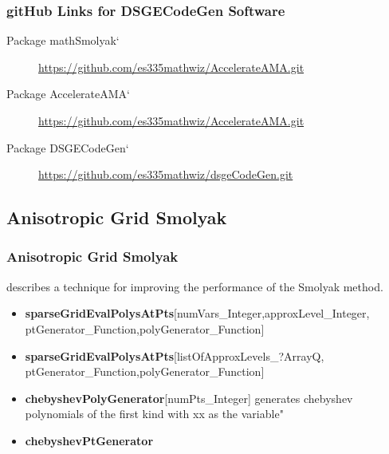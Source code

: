 \documentclass[tikz]{beamer}
\begin{document}
\begin{frame}
  \frametitle{gitHub Links for DSGECodeGen Software}
  

  \begin{description}
  \item[ \cite{Judd2013} Package mathSmolyak`] \href{https://github.com/es335mathwiz/AccelerateAMA.git}{https://github.com/es335mathwiz/AccelerateAMA.git}
  \item[ \cite{anderson10} Package AccelerateAMA`] \href{https://github.com/es335mathwiz/AccelerateAMA.git}{https://github.com/es335mathwiz/AccelerateAMA.git}
  \item[ Package DSGECodeGen` ]\href{https://github.com/es335mathwiz/dsgeCodeGen.git}{https://github.com/es335mathwiz/dsgeCodeGen.git}
\end{description}

\end{frame}



\subsection{Anisotropic Grid Smolyak}


\begin{frame}
  \frametitle{Anisotropic Grid Smolyak}
{\small
\cite{Judd2013} describes a technique for improving the performance of
the Smolyak method.
\begin{itemize}
\item {\bf sparseGridEvalPolysAtPts}[numVars\_Integer,approxLevel\_Integer,
ptGenerator\_Function,polyGenerator\_Function] 
\item {\bf sparseGridEvalPolysAtPts}[listOfApproxLevels\_?ArrayQ,
ptGenerator\_Function,polyGenerator\_Function] 
\item {\bf chebyshevPolyGenerator}[numPts\_Integer] generates chebyshev polynomials of the first kind with xx as the variable"
\item {\bf chebyshevPtGenerator}
\end{itemize}
}
\end{frame}

\end{document}
